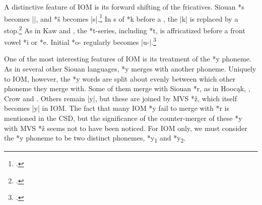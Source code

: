 \documentclass[output=paper]{LSP/langsci}
\begin{document}

A distinctive feature of IOM is its forward shifting of the fricatives.  Siouan *s becomes ||, and *š becomes |s|.\footnote{\citealt[245]{Rankinetal2006PDF}. } In s of *k before a , the |k| is replaced by a  stop.\footnote{\citealt[857]{Rankinetal2006PDF}.}  As in Kaw and , the *t-series, including *t\textsuperscript{}, is affricatized before a front vowel *i or *e.  Initial *o- regularly becomes |u-|.\footnote{\citealt[893]{Rankinetal2006PDF}.}

One of the most interesting features of IOM is its treatment of the  *y phoneme.  As in several other Siouan languages,  *y merges with another phoneme.  Uniquely to IOM, however, the *y words are split about evenly between which other phoneme they merge with.  Some of them merge with Siouan *r, as in Hooc\k{a}k, , Crow and .  Others remain |y|, but these are joined by MVS *\v{z}, which itself becomes |y| in IOM.  The fact that many IOM *y fail to merge with *r is mentioned in the CSD, but the significance of the counter-merger of these *y with MVS *\v{z} seems not to have been noticed.  For IOM only, we must consider the *y phoneme to be two distinct phonemes, *y\textsubscript{1} and *y\textsubscript{2}.
\end{document}
